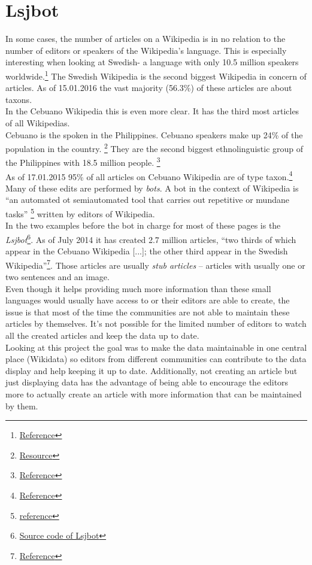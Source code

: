 \section{Lsjbot}
In some cases, the number of articles on a Wikipedia is in no relation to the number of editors or speakers of the Wikipedia's language. This is especially interesting when looking at Swedish- a language with only 10.5 million speakers worldwide.\footnote{\href{http://www.npld.eu/about-us/swedish/}{Reference}} The Swedish Wikipedia is the second biggest Wikipedia in concern of articles. As of 15.01.2016 the vast majority (56.3\%) of these articles are about taxons. \\
In the Cebuano Wikipedia this is even more clear. It has the third most articles of all Wikipedias. \\
Cebuano is the spoken in the Philippines. Cebuano speakers make up 24\% of the population in the country. \footnote{\href{https://terpconnect.umd.edu/~oard/pdf/hlt03.pdf}{Resource}} They are the second biggest ethnolinguistic group of the Philippines with 18.5 million people. \footnote{\href{http://www.britannica.com/topic/Cebuano-language}{Reference}} \\
As of 17.01.2015 95\% of all articles on Cebuano Wikipedia are of type taxon.\footnote{\href{https://www.wikidata.org/wiki/Wikidata:Statistics/Wikipedia}{Reference}} \\
Many of these edits are performed by \textit{bots}. A bot in the context of Wikipedia is ``an automated ot semiautomated tool that carries out repetitive or mundane tasks'' \footnote{\href{https://en.wikipedia.org/w/index.php?title=Wikipedia:Bots&oldid=662582073}{reference}} written by editors of Wikipedia. \\
In the two examples before the bot in charge for most of these pages is the \textit{Lsjbot}\footnote{\href{https://sv.wikipedia.org/wiki/Wikipedia:Projekt_DotNetWikiBot_Framework/Lsjbot/Makespecies}{Source code of Lsjbot}}. As of July 2014 it has created 2.7 million articles, ``two thirds of which appear in the Cebuano Wikipedia [...]; the other third appear in the Swedish Wikipedia''\footnote{\href{https://en.wikipedia.org/wiki/Lsjbot}{Reference}}. Those articles are usually \textit{stub articles} -- articles with usually one or two sentences and an image. \\
Even though it helps providing much more information than these small languages would usually have access to or their editors are able to create, the issue is that most of the time the communities are not able to maintain these articles by themselves. It's not possible for the limited number of editors to watch all the created articles and keep the data up to date. \\
Looking at this project the goal was to make the data maintainable in one central place (Wikidata) so editors from different communities can contribute to the data display and help keeping it up to date. Additionally, not creating an article but just displaying data has the advantage of being able to encourage the editors more to actually create an article with more information that can be maintained by them. 

